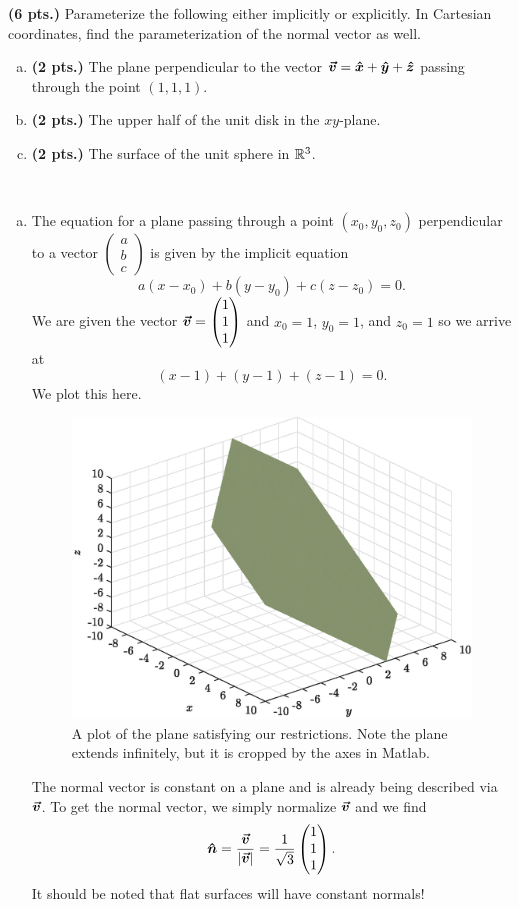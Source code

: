 \documentclass[12pt]{article} %
\newcommand{\unitvec}{\boldsymbol{\hat{n}}}
\begin{document}
\begin{problem}
	\textbf{(6 pts.)} Parameterize the following either implicitly or explicitly. In Cartesian coordinates, find the parameterization of the normal vector as well.
	\begin{enumerate}[(a)]
		\item \textbf{(2 pts.)} The plane perpendicular to the vector $\boldsymbol{\vec{v}} = \boldsymbol{\hat{x}} + \boldsymbol{\hat{y}} + \boldsymbol{\hat{z}}$ passing through the point $(1,1,1)$.
		\item \textbf{(2 pts.)} The upper half of the unit disk in the $xy$-plane.
		\item \textbf{(2 pts.)} The surface of the unit sphere in $\mathbb{R}^3$.
	\end{enumerate}
\end{problem}
\begin{solution}~
\begin{enumerate}[(a)]
    \item The equation for a plane passing through a point $(x_0,y_0,z_0)$ perpendicular to a vector $\begin{pmatrix} a \\ b \\ c \end{pmatrix}$ is given by the implicit equation
    \[
    a(x-x_0)+b(y-y_0) + c(z-z_0) = 0.
    \]
    We are given the vector $\boldsymbol{\vec{v}} = \begin{pmatrix} 1 \\ 1 \\ 1 \end{pmatrix}$ and $x_0=1$, $y_0=1$, and $z_0=1$ so we arrive at
    \[ 
    (x-1)+(y-1)+(z-1)=0.
    \]
    We plot this here.
    \begin{figure}[H]
        \centering
        \includegraphics[width=.6\textwidth]{figures/plane}
        \caption{A plot of the plane satisfying our restrictions. Note the plane extends infinitely, but it is cropped by the axes in Matlab.}
    \end{figure}
    The normal vector is constant on a plane and is already being described via $\boldsymbol{\vec{v}}$. To get the normal vector, we simply normalize $\boldsymbol{\vec{v}}$ and we find
    \[
    \unitvec = \frac{\vecv}{|\vecv|} = \frac{1}{\sqrt{3}} \begin{pmatrix} 1 \\ 1 \\ 1 \end{pmatrix}.
    \]
    It should be noted that flat surfaces will have constant normals!


\end{enumerate}
\end{solution}
\end{document}
